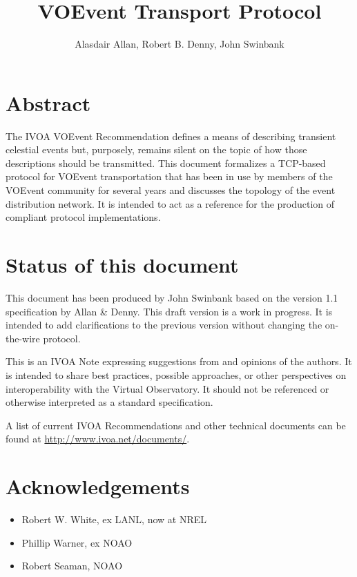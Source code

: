 \documentclass[a4paper,11pt]{ivoa}
\title{VOEvent Transport Protocol}
\author{Alasdair Allan, Robert B. Denny, John Swinbank}
\begin{document}
\maketitle

\section*{Abstract}

The IVOA VOEvent Recommendation \citep{Seaman:2011} defines a means of
describing transient celestial events but, purposely, remains silent on the
topic of how those descriptions should be transmitted. This document
formalizes a TCP-based protocol for VOEvent transportation that has been in
use by members of the VOEvent community for several years and discusses the
topology of the event distribution network. It is intended to act as a
reference for the production of compliant protocol implementations.

\section*{Status of this document}

This document has been produced by John Swinbank based on the version 1.1
specification by Allan \& Denny. This draft version is a work in progress. It
is intended to add clarifications to the previous version without changing the
on-the-wire protocol.

This is an IVOA Note expressing suggestions from and opinions of the authors.
It is intended to share best practices, possible approaches, or other
perspectives on interoperability with the Virtual Observatory. It should not
be referenced or otherwise interpreted as a standard specification.

A list of current IVOA Recommendations and other technical documents can be
found at \url{http://www.ivoa.net/documents/}.

\section*{Acknowledgements}

\begin{itemize}
    \item{Robert W. White, ex LANL, now at NREL}
    \item{Phillip Warner, ex NOAO}
    \item{Robert Seaman, NOAO}
\end{itemize}
\end{document}
